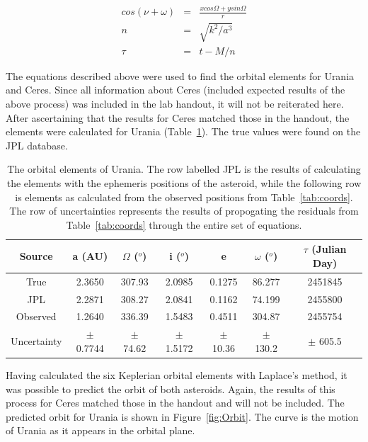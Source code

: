 \documentclass[a4paper,12pt]{article}
\begin{document}
\begin{eqnarray}
\label{eqn:argperihelion}
cos(\nu+\omega) &=& \frac{xcos\Omega + ysin\Omega}{r}\\
n &=& \sqrt{k^2/a^3}\nonumber\\
\label{eqn:timeperihelion}
\tau &=& t - M/n
\end{eqnarray}

The equations described above were used to find the orbital elements for Urania and Ceres. Since all information about Ceres (included expected results of the above process) was included in the lab handout, it will not be reiterated here. After ascertaining that the results for Ceres matched those in the handout, the elements were calculated for Urania (Table~\ref{tab:elements}). The true values were found on the JPL database.

\begin{table}[!htbp]
	\centering
	\begin{tabular}{|c||c||c||c||c||c||c|}
	\hline
	Source & a (AU) & $\Omega$ ($^o$) & i ($^o$) & e & $\omega$ ($^o$) & $\tau$ (Julian Day)\\
	\hline
  \hline
	True & 2.3650 & 307.93 & 2.0985 & 0.1275 & 86.277 & 2451845\\
	\hline
	JPL & 2.2871 & 308.27 & 2.0841 & 0.1162 & 74.199 & 2455800\\
	\hline
	Observed & 1.2640 & 336.39 & 1.5483 & 0.4511 & 304.87 & 2455754 \\
  \hline
  Uncertainty & $\pm$ 0.7744 & $\pm$ 74.62 & $\pm$ 1.5172 & $\pm$ 10.36 & $\pm$ 130.2 & $\pm$ 605.5\\
  \hline
	\end{tabular}
	\caption{The orbital elements of Urania. The row labelled JPL is the results of calculating the elements with the ephemeris positions of the asteroid, while the following row is elements as calculated from the observed positions from Table~\ref{tab:coords}. The row of uncertainties represents the results of propogating the residuals from Table~\ref{tab:coords} through the entire set of equations.}
	\label{tab:elements}
\end{table}

Having calculated the six Keplerian orbital elements with Laplace's method, it was possible to predict the orbit of both asteroids. Again, the results of this process for Ceres matched those in the handout and will not be included. The predicted orbit for Urania is shown in Figure~\ref{fig:Orbit}. The curve is the motion of Urania as it appears in the orbital plane.
\end{document}
